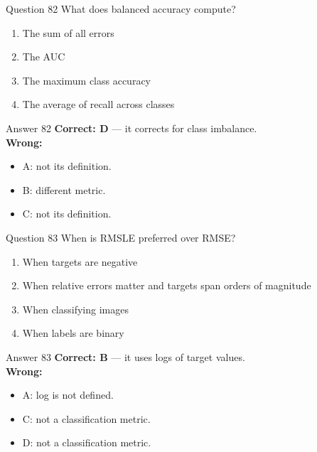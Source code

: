 \documentclass[aspectratio=169,11pt]{beamer}
\begin{document}
\begin{frame}{Question 82}
What does balanced accuracy compute?
\begin{enumerate}[label=\Alph*.]
\item The sum of all errors
\item The AUC
\item The maximum class accuracy
\item The average of recall across classes
\end{enumerate}
\end{frame}
\begin{frame}{Answer 82}
\textbf{Correct: D} --- it corrects for class imbalance.\\
\vspace{0.5em}
\textbf{Wrong:}
\begin{itemize}
\item A: not its definition.
\item B: different metric.
\item C: not its definition.
\end{itemize}
\end{frame}

\begin{frame}{Question 83}
When is RMSLE preferred over RMSE?
\begin{enumerate}[label=\Alph*.]
\item When targets are negative
\item When relative errors matter and targets span orders of magnitude
\item When classifying images
\item When labels are binary
\end{enumerate}
\end{frame}
\begin{frame}{Answer 83}
\textbf{Correct: B} --- it uses logs of target values.\\
\vspace{0.5em}
\textbf{Wrong:}
\begin{itemize}
\item A: log is not defined.
\item C: not a classification metric.
\item D: not a classification metric.
\end{itemize}
\end{frame}
\end{document}
